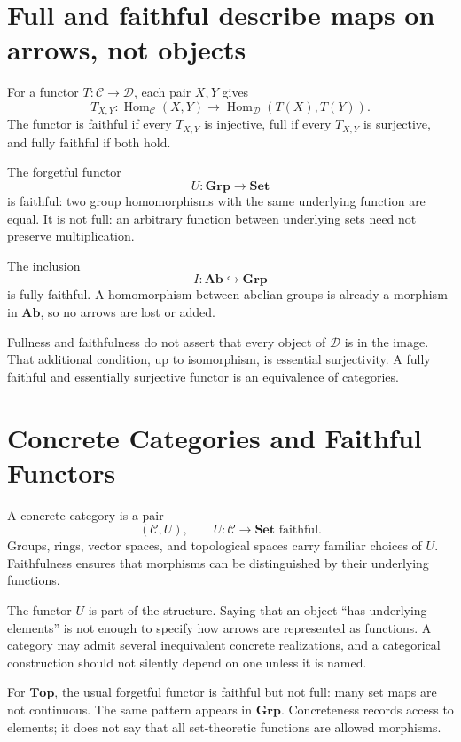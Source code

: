 \section{Full and faithful describe maps on arrows, not objects}

For a functor \(T:\mathcal C\to\mathcal D\), each pair \(X,Y\) gives
\[
  T_{X,Y}:
  \operatorname{Hom}_{\mathcal C}(X,Y)
  \to
  \operatorname{Hom}_{\mathcal D}(T(X),T(Y)).
\]
The functor is faithful if every \(T_{X,Y}\) is injective, full if every \(T_{X,Y}\) is surjective, and fully faithful if both hold.

The forgetful functor
\[
  U:\mathbf{Grp}\to\mathbf{Set}
\]
is faithful: two group homomorphisms with the same underlying function are equal.  It is not full: an arbitrary function between underlying sets need not preserve multiplication.

The inclusion
\[
  I:\mathbf{Ab}\hookrightarrow\mathbf{Grp}
\]
is fully faithful.  A homomorphism between abelian groups is already a morphism in \(\mathbf{Ab}\), so no arrows are lost or added.

Fullness and faithfulness do not assert that every object of \(\mathcal D\) is in the image.  That additional condition, up to isomorphism, is essential surjectivity.  A fully faithful and essentially surjective functor is an equivalence of categories.

\section{Concrete Categories and Faithful Functors}

A concrete category is a pair
\[
  (\mathcal C,U),
  \qquad
  U:\mathcal C\to\mathbf{Set}
  \text{ faithful}.
\]
Groups, rings, vector spaces, and topological spaces carry familiar choices of \(U\).  Faithfulness ensures that morphisms can be distinguished by their underlying functions.

The functor \(U\) is part of the structure.  Saying that an object ``has underlying elements'' is not enough to specify how arrows are represented as functions.  A category may admit several inequivalent concrete realizations, and a categorical construction should not silently depend on one unless it is named.

For \(\mathbf{Top}\), the usual forgetful functor is faithful but not full: many set maps are not continuous.  The same pattern appears in \(\mathbf{Grp}\).  Concreteness records access to elements; it does not say that all set-theoretic functions are allowed morphisms.

